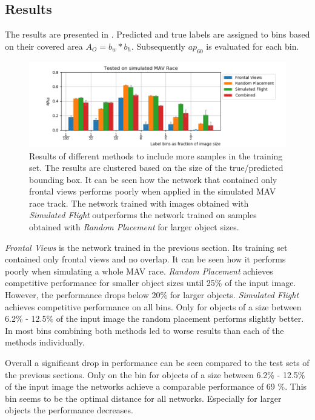 \subsection{Results}

The results are presented in . Predicted and true labels are assigned to bins based on their covered area $A_O=b_w*b_h$. Subsequently $ap_{60}$ is evaluated for each bin. 
\begin{figure}[hbtp]
	\includegraphics[width=\textwidth]{fig/view_size}
	\caption{Results of different methods to include more samples in the training set. The results are clustered based on the size of the true/predicted bounding box. It can be seen how the network that contained only frontal views performs poorly when applied in the simulated \ac{MAV} race track. The network trained with images obtained with \textit{Simulated Flight} outperforms the network trained on samples obtained with \textit{Random Placement} for larger object sizes.}
	\label{fig:view_size}
\end{figure}

\textit{Frontal Views} is the network trained in the previous section. Its training set contained only frontal views and no overlap. It can be seen how it performs poorly when simulating a whole \ac{MAV} race. \textit{Random Placement} achieves competitive performance for smaller object sizes until 25\% of the input image. However, the performance drops below 20\% for larger objects. \textit{Simulated Flight} achieves competitive performance on all bins. Only for objects of a size between 6.2\% - 12.5\% of the input image the random placement performs slightly better. In most bins combining both methods led to worse results than each of the methods individually.

Overall a significant drop in performance can be seen compared to the test sets of the previous sections. Only on the bin for objects of a size between 6.2\% - 12.5\% of the input image the networks achieve a comparable performance of 69 \%. This bin seems to be the optimal distance for all networks. Especially for larger objects the performance decreases.


